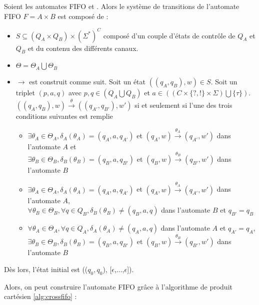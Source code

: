Soient les automates FIFO \fifoA et \fifoB. Alors le système de transitions \tsys de l'automate FIFO $F=A\times B$ est composé de :
\begin{itemize}
  \item $S \subseteq (Q_A\times Q_B)\times (\Sigma^*)^C$ composé d'un couple d'états de contrôle de $Q_A$ et $Q_B$ et du contenu des différents canaux.
  \item $\Theta = \Theta_A \bigcup \Theta_B$
  \item $\rightarrow$ est construit comme suit. Soit un état $((q_A,q_B), w)\in S$. Soit un triplet $(p,a,q)$ avec $p,q \in (Q_A \bigcup Q_B)$ et $a \in ((C \times \{?,!\} \times \Sigma) \bigcup \{\tau\})$.
  $((q_A,q_B),w)\xrightarrow{\theta}((q_{A'},q_{B'}),w')$ si et seulement si l'une des trois conditions suivantes est remplie

  \begin{itemize}
    \item $\exists \theta_A\in\Theta_A, \delta_A(\theta_A)=(q_A,a,q_{A'})$ et  $(q_A,w)\xrightarrow{\theta_A}(q_{A'},w')$ dans l'automate $A$ et\\ $\exists \theta_B\in\Theta_B, \delta_B(\theta_B)=(q_B,a,q_{B'})$ et $(q_B,w)\xrightarrow{\theta_B}(q_{B'},w')$ dans l'automate $B$
    \item $\exists \theta_A\in\Theta_A, \delta_A(\theta_A)=(q_A,a,q_{A'})$ et  $(q_A,w)\xrightarrow{\theta_A}(q_{A'},w')$ dans l'automate $A$,\\
    $\forall \theta_B\in\Theta_B,\forall q \in Q_B,\delta_B(\theta_B)\neq(q_B,a,q)$ dans l'automate $B$ et $q_{B'}=q_B$
    \item $\forall \theta_A\in\Theta_A,\forall q \in Q_A,\delta_A(\theta_A)\neq(q_A,a,q)$ dans l'automate $A$ et $q_{A'}=q_A$,\\
    $\exists \theta_B\in\Theta_B, \delta_B(\theta_B)=(q_B,a,q_{B'})$ et  $(q_B,w)\xrightarrow{\theta_B}(q_{B'},w')$ dans l'automate $B$
  \end{itemize}
\end{itemize}


Dès lors, l'état initial est (($q_0,q_0$), [$\epsilon$,...,$\epsilon$]). \cite{Suresh20}


Alors, on peut construire l'automate FIFO \fifo grâce à l'algorithme de produit cartésien \ref{alg:crossfifo} :

